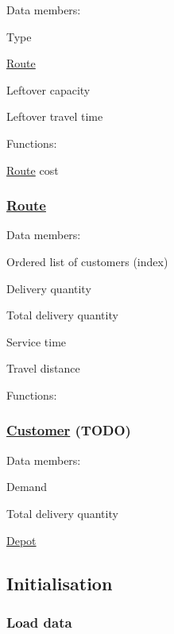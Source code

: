 Data members\+:
\begin{DoxyItemize}
\item Type
\item \hyperlink{class_route}{Route}
\item Leftover capacity
\item Leftover travel time
\end{DoxyItemize}

Functions\+:
\begin{DoxyItemize}
\item \hyperlink{class_route}{Route} cost
\end{DoxyItemize}

\subsubsection*{\hyperlink{class_route}{Route}}

Data members\+:
\begin{DoxyItemize}
\item Ordered list of customers (index)
\item Delivery quantity
\item Total delivery quantity
\item Service time
\item Travel distance
\end{DoxyItemize}

Functions\+:

\subsubsection*{\hyperlink{class_customer}{Customer} (T\+O\+DO)}

Data members\+:
\begin{DoxyItemize}
\item Demand
\item Total delivery quantity
\item \hyperlink{class_depot}{Depot}
\end{DoxyItemize}

\subsection*{Initialisation}

\subsubsection*{Load data}

